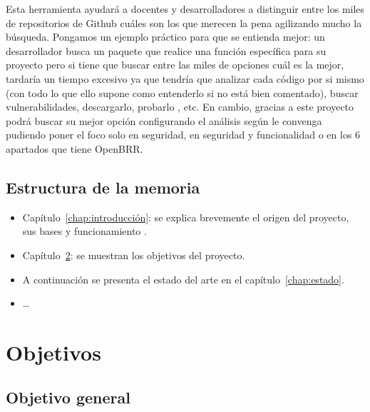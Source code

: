 \documentclass[a4paper, 12pt]{book}
\begin{document}
Esta herramienta ayudará a docentes y desarrolladores a distinguir entre los miles de repositorios de Github cuáles son los que merecen la pena agilizando mucho la búsqueda. Pongamos un ejemplo práctico para que se entienda mejor: un desarrollador busca un paquete
que realice una función específica para su proyecto pero si tiene que buscar entre las miles de opciones cuál es la mejor, tardaría un tiempo excesivo ya que tendría que analizar cada código por si mismo (con todo lo que ello supone como entenderlo si no está bien comentado),
buscar vulnerabilidades, descargarlo, probarlo , etc. En cambio, gracias a este proyecto podrá buscar su mejor opción configurando el análisis según le convenga pudiendo poner el foco solo en seguridad, en seguridad y funcionalidad o en los 6 apartados que tiene OpenBRR.


\section{Estructura de la memoria}
\label{sec:estructura}

\begin{itemize}
  \item Capítulo~\ref{chap:introducción}: se explica brevemente el origen del proyecto, sus bases y funcionamiento .
  
  \item Capítulo~\ref{chap:objetivos}: se muestran los objetivos del proyecto.
  
  \item A continuación se presenta el estado del arte en el capítulo~\ref{chap:estado}.
  
  \item \ldots
\end{itemize}




\cleardoublepage %
\chapter{Objetivos} %
\label{chap:objetivos} %

\section{Objetivo general} %
\label{sec:objetivo-general} %
\end{document}
